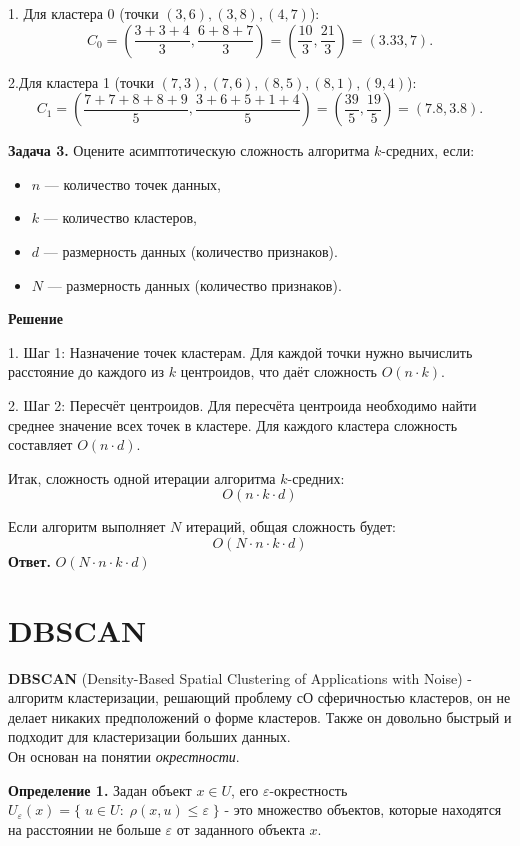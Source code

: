 1. Для кластера 0 (точки \((3, 6), (3, 8), (4, 7)\)):
\[
C_0 = \left( \frac{3+3+4}{3}, \frac{6+8+7}{3} \right) = \left( \frac{10}{3}, \frac{21}{3} \right) = (3.33, 7).
\]

2.Для кластера 1 (точки \((7, 3), (7, 6), (8, 5), (8, 1), (9, 4)\)):
\[
C_1 = \left( \frac{7+7+8+8+9}{5}, \frac{3+6+5+1+4}{5} \right) = \left( \frac{39}{5}, \frac{19}{5} \right) = (7.8, 3.8).
\]

\textbf{Задача 3.}
Оцените асимптотическую сложность алгоритма \(k\)-средних, если:
\begin{itemize}
    \item \(n\) — количество точек данных,
    \item \(k\) — количество кластеров,
    \item \(d\) — размерность данных (количество признаков).
    \item \(N\) — размерность данных (количество признаков).
\end{itemize}

\textbf{Решение}

1. Шаг 1: Назначение точек кластерам.
   Для каждой точки нужно вычислить расстояние до каждого из \(k\) центроидов, что даёт сложность \(O(n \cdot k)\).

2. Шаг 2: Пересчёт центроидов.
   Для пересчёта центроида необходимо найти среднее значение всех точек в кластере. Для каждого кластера сложность составляет \(O(n \cdot d)\).

Итак, сложность одной итерации алгоритма \(k\)-средних: 
\[
O(n \cdot k \cdot d)
\]

Если алгоритм выполняет \(N\) итераций, общая сложность будет:
\[
O(N \cdot n \cdot k \cdot d)
\]
\textbf{Ответ.} $O(N \cdot n \cdot k \cdot d)$


\section{DBSCAN}

\textbf{DBSCAN} (Density-Based Spatial Clustering of Applications with Noise) - алгоритм кластеризации, решающий проблему сО сферичностью кластеров, он не делает никаких предположений о форме кластеров. Также он довольно быстрый и подходит для кластеризации больших данных.
\\
Он основан на понятии {\textit{окрестности}}.

\textbf{Определение 1.} Задан объект $x \in U$, его $\varepsilon$-окрестность $U_\varepsilon (x) = \{\;u\in U:\; \rho (x,u) \leq \varepsilon \;\}$ - это множество объектов, которые находятся на расстоянии не больше $\varepsilon$ от заданного объекта $x$.

